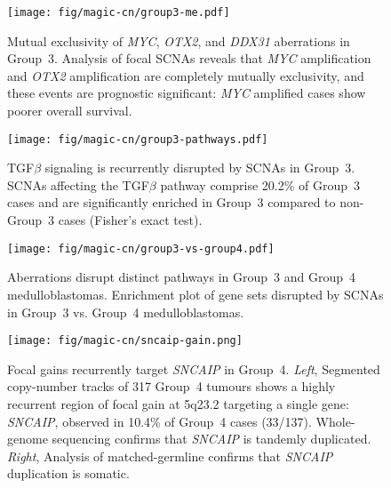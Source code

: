 \documentclass[11pt,letterpaper]{article}
\theoremstyle{definition}
\begin{document}
\clearpage

\begin{figure}[h]
	\begin{center}
		\texttt{[image: fig/magic-cn/group3-me.pdf]}
	\end{center}
	\caption[Mutual exclusivity of \emph{MYC}, \emph{OTX2}, and \emph{DDX31} aberrations in Group~3]
	{
	Mutual exclusivity of \emph{MYC}, \emph{OTX2}, and \emph{DDX31} aberrations in Group~3.
	Analysis of focal SCNAs reveals that \emph{MYC} amplification and \emph{OTX2} amplification are completely mutually exclusivity, and these events are prognostic significant: \emph{MYC} amplified cases show poorer overall survival.
	}
	\label{fig:group3-me}
\end{figure}

\begin{SCfigure}
	\centering
	\texttt{[image: fig/magic-cn/group3-pathways.pdf]}
	\caption[TGF$\beta$ signaling is recurrently disrupted by SCNAs in Group~3]
	{
	TGF$\beta$ signaling is recurrently disrupted by SCNAs in Group~3.
	SCNAs affecting the TGF$\beta$ pathway comprise 20.2\% of Group~3 cases and are significantly enriched in Group~3 compared to non-Group~3 cases (Fisher's exact test).
	}
	\label{fig:group3-pathways}
\end{SCfigure}

\begin{SCfigure}
	\centering
	\texttt{[image: fig/magic-cn/group3-vs-group4.pdf]}
	\caption[Aberrations disrupt distinct pathways in Group~3 and Group~4 medulloblastomas]
	{
	Aberrations disrupt distinct pathways in Group~3 and Group~4 medulloblastomas.
	Enrichment plot of gene sets disrupted by SCNAs in Group~3 vs. Group~4 medulloblastomas.
	}
	\label{fig:group3-vs-group4}
\end{SCfigure}

\clearpage

\begin{figure}[h]
	\begin{center}
		\texttt{[image: fig/magic-cn/sncaip-gain.png]}
	\end{center}
	\caption[Focal gains recurrently target \emph{SNCAIP} in Group~4]
	{
	Focal gains recurrently target \emph{SNCAIP} in Group~4.
	\emph{Left}, Segmented copy-number tracks of 317 Group~4 tumours shows a highly recurrent region of focal gain at 5q23.2 targeting a single gene: \emph{SNCAIP}, observed in 10.4\% of Group~4 cases (33/137). Whole-genome sequencing confirms that \emph{SNCAIP} is tandemly duplicated. \emph{Right}, Analysis of matched-germline confirms that \emph{SNCAIP} duplication is somatic.
	}
	\label{fig:sncaip-gain}
\end{figure}
\end{document}
